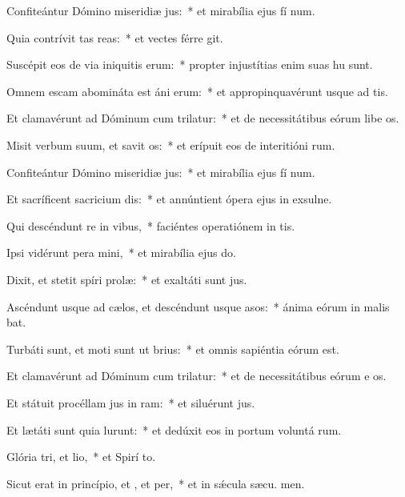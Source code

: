 \item Confiteántur Dómino miseridiæ jus:~* et mirabília ejus fí num.
\item Quia contrívit tas reas:~* et vectes férre git.
\item Suscépit eos de via iniquitis erum:~* propter injustítias enim suas hu sunt.
\item Omnem escam abomináta est áni erum:~* et appropinquavérunt usque ad  tis.
\item Et clamavérunt ad Dóminum cum trilatur:~* et de necessitátibus eórum libe os.
\item Misit verbum suum, et savit os:~* et erípuit eos de interitióni rum.
\item Confiteántur Dómino miseridiæ jus:~* et mirabília ejus fí num.
\item Et sacríficent sacricium dis:~* et annúntient ópera ejus in exsulne.
\item Qui descéndunt re in vibus,~* faciéntes operatiónem in  tis.
\item Ipsi vidérunt pera mini,~* et mirabília ejus  do.
\item Dixit, et stetit spíri prolæ:~* et exaltáti sunt  jus.
\item Ascéndunt usque ad cælos, et descéndunt usque  asos:~* ánima eórum in malis bat.
\item Turbáti sunt, et moti sunt ut brius:~* et omnis sapiéntia eórum  est.
\item Et clamavérunt ad Dóminum cum trilatur:~* et de necessitátibus eórum e os.
\item Et státuit procéllam jus in ram:~* et siluérunt  jus.
\item Et lætáti sunt quia lurunt:~* et dedúxit eos in portum voluntá rum.
\item Glória tri, et lio,~* et Spirí to.
\item Sicut erat in princípio, et , et per,~* et in sǽcula sæcu. men.
